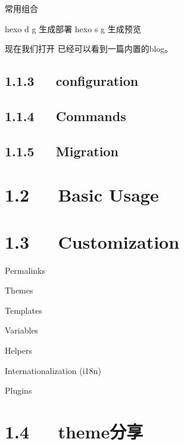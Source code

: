 \documentclass[letterpaper,12pt,english]{sphinxmanual}
\begin{document}
常用组合

\begin{sphinxVerbatim}[commandchars=\\\{\}]
\PYGZdl{} hexo d \PYGZhy{}g \PYGZsh{}生成部署
\PYGZdl{} hexo s \PYGZhy{}g \PYGZsh{}生成预览
\end{sphinxVerbatim}

现在我们打开  已经可以看到一篇内置的blog。


\subsection{1.1.3   configuration}
\label{\detokenize{001software/001install/001._u7f51_u7ad9/hexo:configuration}}


\subsection{1.1.4   Commands}
\label{\detokenize{001software/001install/001._u7f51_u7ad9/hexo:commands}}

\subsection{1.1.5   Migration}
\label{\detokenize{001software/001install/001._u7f51_u7ad9/hexo:migration}}

\section{1.2   Basic Usage}
\label{\detokenize{001software/001install/001._u7f51_u7ad9/hexo:basic-usage}}

\section{1.3   Customization}
\label{\detokenize{001software/001install/001._u7f51_u7ad9/hexo:customization}}
Permalinks

Themes


Templates

Variables

Helpers

Internationalization (i18n)

Plugins


\section{1.4   theme分享}
\label{\detokenize{001software/001install/001._u7f51_u7ad9/hexo:theme}}
\end{document}
